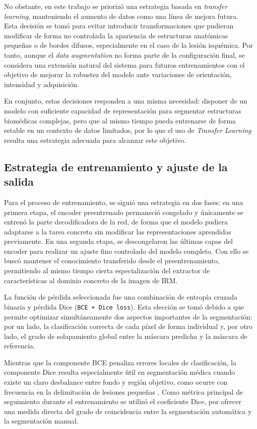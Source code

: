 No obstante, en este trabajo se priorizó una estrategia basada en \textit{transfer learning}, manteniendo el aumento de datos como una línea de mejora futura. Esta decisión se tomó para evitar introducir transformaciones que pudieran modificar de forma no controlada la apariencia de estructuras anatómicas pequeñas o de bordes difusos, especialmente en el caso de la lesión isquémica. Por tanto, aunque el \textit{data augmentation} no forma parte de la configuración final, se considera una extensión natural del sistema para futuros entrenamientos con el objetivo de mejorar la robustez del modelo ante variaciones de orientación, intensidad y adquisición.

En conjunto, estas decisiones responden a una misma necesidad: disponer de un modelo con suficiente capacidad de representación para segmentar estructuras biomédicas complejas, pero que al mismo tiempo pueda entrenarse de forma estable en un contexto de datos limitados, por lo que el uso de \textit{Transfer Learning} resulta una estrategia adecuada para alcanzar este objetivo.

\subsection{Estrategia de entrenamiento y ajuste de la salida}

Para el proceso de entrenamiento, se siguió una estrategia en dos fases: en una primera etapa, el encoder preentrenado permaneció congelado y únicamente se entrenó la parte decodificadora de la red, de forma que el modelo pudiera adaptarse a la tarea concreta sin modificar las representaciones aprendidas previamente. En una segunda etapa, se descongelaron las últimas capas del encoder para realizar un ajuste fino controlado del modelo completo. Con ello se buscó mantener el conocimiento transferido desde el preentrenamiento, permitiendo al mismo tiempo cierta especialización del extractor de características al dominio concreto de la imagen de IRM.

La función de pérdida seleccionada fue una combinación de entropía cruzada binaria y pérdida Dice (\texttt{BCE + Dice loss}). Esta elección se tomó debido a que permite optimizar simultáneamente dos aspectos importantes de la segmentación: por un lado, la clasificación correcta de cada píxel de forma individual y, por otro lado, el grado de solapamiento global entre la máscara predicha y la máscara de referencia.

Mientras que la componente BCE penaliza errores locales de clasificación, la componente Dice resulta especialmente útil en segmentación médica cuando existe un claro desbalance entre fondo y región objetivo, como ocurre con frecuencia en la delimitación de lesiones pequeñas \citep{milletari2016vnet}. Como métrica principal de seguimiento durante el entrenamiento se utilizó el coeficiente Dice, por ofrecer una medida directa del grado de coincidencia entre la segmentación automática y la segmentación manual.

